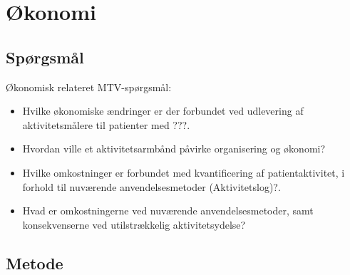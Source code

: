 \chapter{Økonomi}
\section{Spørgsmål}



\noindent
Økonomisk relateret MTV-spørgsmål:  
\begin{itemize}
\item Hvilke økonomiske ændringer er der forbundet ved udlevering af aktivitetsmålere til patienter med ???.

\item Hvordan ville et aktivitetsarmbånd påvirke organisering og økonomi?

\item Hvilke omkostninger er forbundet med kvantificering af patientaktivitet, i forhold til nuværende anvendelsesmetoder (Aktivitetslog)?.  

\item Hvad er omkostningerne ved nuværende anvendelsesmetoder, samt konsekvenserne ved utilstrækkelig aktivitetsydelse? 
\end{itemize}

\section{Metode}

